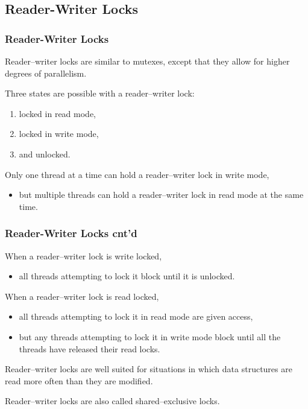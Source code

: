 \documentclass[newPxFont,sthlmFooter,nooffset]{beamer}
\begin{document}
\subsection{Reader-Writer Locks}


\begin{frame}[t]
  \frametitle{Reader-Writer Locks}
Reader–writer locks are similar to mutexes, except that they allow for higher degrees of parallelism.

Three states are possible with a reader–writer lock:
\begin{enumerate}
\item locked in read mode,
\item locked in write mode,
\item and unlocked.
\end{enumerate}

Only one thread at a time can hold a reader–writer lock in write mode,
\begin{itemize}
\item but multiple threads can hold a reader–writer lock in read mode
  at the same time.
\end{itemize}

\end{frame}

\begin{frame}[t]
  \frametitle{Reader-Writer Locks cnt'd}
When a reader–writer lock is write locked,
\begin{itemize}
\item all threads attempting to lock it block until it is unlocked.
\end{itemize}
When a reader–writer lock is read locked,
\begin{itemize}
\item all threads attempting to lock it in read mode are given access,
\item but any threads attempting to lock it in write mode block until all
  the threads have released their read locks.
\end{itemize}

Reader–writer locks are well suited for situations in which data structures are read more often than they are modified.

Reader–writer locks are also called shared–exclusive locks.
\end{frame}
\end{document}
